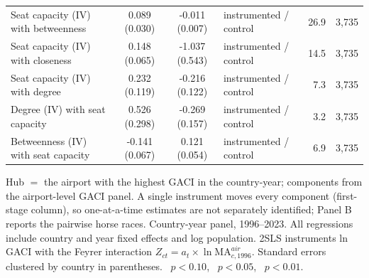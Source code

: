 \begin{table}[p]
\begin{minipage}{\linewidth}
{\begin{tabular}{lcccccrr}
Seat capacity (IV) with betweenness & 0.089\sym{***} (0.030) & -0.011\sym{*} (0.007) & \multicolumn{3}{l}{instrumented / control} & 26.9 & 3{,}735 \\
Seat capacity (IV) with closeness & 0.148\sym{**} (0.065) & -1.037\sym{*} (0.543) & \multicolumn{3}{l}{instrumented / control} & 14.5 & 3{,}735 \\
Seat capacity (IV) with degree & 0.232\sym{*} (0.119) & -0.216\sym{*} (0.122) & \multicolumn{3}{l}{instrumented / control} & 7.3 & 3{,}735 \\
Degree (IV) with seat capacity & 0.526\sym{*} (0.298) & -0.269\sym{*} (0.157) & \multicolumn{3}{l}{instrumented / control} & 3.2 & 3{,}735 \\
Betweenness (IV) with seat capacity & -0.141\sym{**} (0.067) & 0.121\sym{**} (0.054) & \multicolumn{3}{l}{instrumented / control} & 6.9 & 3{,}735 \\
\bottomrule
\end{tabular}}
\par\vspace{3pt}\begin{flushleft}\footnotesize Hub $=$ the airport with the highest GACI in the country-year; components from the airport-level GACI panel. A single instrument moves every component (first-stage column), so one-at-a-time estimates are not separately identified; Panel B reports the pairwise horse races. Country-year panel, 1996--2023. All regressions include country and year fixed effects and log population. 2SLS instruments ln GACI with the Feyrer interaction $Z_{ct}=a_t\times\ln \mathrm{MA}^{air}_{c,1996}$. Standard errors clustered by country in parentheses. \sym{*}~$p<0.10$, \sym{**}~$p<0.05$, \sym{***}~$p<0.01$.\end{flushleft}
\end{minipage}
\end{table}
